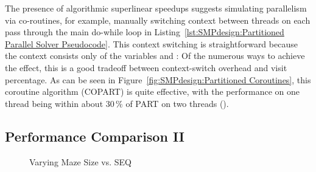 The presence of algorithmic superlinear speedups suggests simulating
parallelism via co-routines, for example, manually switching context
between threads on each pass through the main do-while loop in
Listing~\ref{lst:SMPdesign:Partitioned Parallel Solver Pseudocode}.
This context switching is straightforward because the context
consists only of the variables  and : Of the numerous
ways to achieve the effect, this is a good tradeoff between
context-switch overhead and visit percentage.
As can be seen in
Figure~\ref{fig:SMPdesign:Partitioned Coroutines},
this coroutine algorithm (COPART) is quite effective, with the performance
on one thread being within about 30\,\% of PART on two threads
().
\fi

\subsection{Performance Comparison II}
\label{sec:SMPdesign:Performance Comparison II}

\begin{figure}[tb]
\centering
{}
\caption{Varying Maze Size vs. SEQ}
\label{fig:SMPdesign:Varying Maze Size vs. SEQ}
\end{figure}

